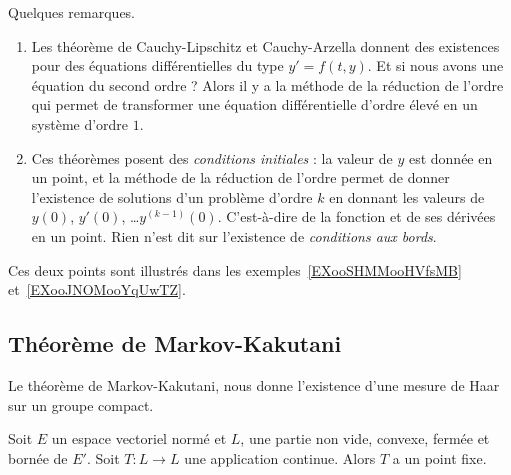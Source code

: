\begin{remark}
	Quelques remarques.
	\begin{enumerate}
		\item
		      Les théorème de Cauchy-Lipschitz et Cauchy-Arzella donnent des existences pour des équations différentielles du type \( y'=f(t,y)\). Et si nous avons une équation du second ordre ? Alors il y a la méthode de la réduction de l'ordre qui permet de transformer une équation différentielle d'ordre élevé en un système d'ordre \( 1\).
		\item
		      Ces théorèmes posent des \emph{conditions initiales} : la valeur de \( y\) est donnée en un point, et la méthode de la réduction de l'ordre permet de donner l'existence de solutions d'un problème d'ordre \( k\) en donnant les valeurs de \( y(0)\), \( y'(0)\), \ldots \( y^{(k-1)}(0)\). C'est-à-dire de la fonction et de ses dérivées en un point. Rien n'est dit sur l'existence de \emph{conditions aux bords}.
	\end{enumerate}
	Ces deux points sont illustrés dans les exemples~\ref{EXooSHMMooHVfsMB} et~\ref{EXooJNOMooYqUwTZ}.
\end{remark}

\subsection{Théorème de Markov-Kakutani}

Le théorème de Markov-Kakutani, nous donne l'existence d'une mesure de Haar sur un groupe compact.

\begin{theorem}   \label{ThoeJCdMP}
	Soit \( E\) un espace vectoriel normé et \( L\), une partie non vide, convexe, fermée et bornée de \( E'\). Soit \( T\colon L\to L\) une application continue. Alors \( T\) a un point fixe.
\end{theorem}


